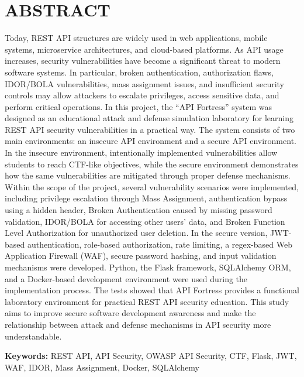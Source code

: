 \clearpage
\section*{ABSTRACT}
\label{ozeten}

Today, REST API structures are widely used in web applications, mobile systems, microservice architectures, and cloud-based platforms. As API usage increases, security vulnerabilities have become a significant threat to modern software systems. In particular, broken authentication, authorization flaws, IDOR/BOLA vulnerabilities, mass assignment issues, and insufficient security controls may allow attackers to escalate privileges, access sensitive data, and perform critical operations. In this project, the ``API Fortress'' system was designed as an educational attack and defense simulation laboratory for learning REST API security vulnerabilities in a practical way. The system consists of two main environments: an insecure API environment and a secure API environment. In the insecure environment, intentionally implemented vulnerabilities allow students to reach CTF-like objectives, while the secure environment demonstrates how the same vulnerabilities are mitigated through proper defense mechanisms. Within the scope of the project, several vulnerability scenarios were implemented, including privilege escalation through Mass Assignment, authentication bypass using a hidden header, Broken Authentication caused by missing password validation, IDOR/BOLA for accessing other users' data, and Broken Function Level Authorization for unauthorized user deletion. In the secure version, JWT-based authentication, role-based authorization, rate limiting, a regex-based Web Application Firewall (WAF), secure password hashing, and input validation mechanisms were developed. Python, the Flask framework, SQLAlchemy ORM, and a Docker-based development environment were used during the implementation process. The tests showed that API Fortress provides a functional laboratory environment for practical REST API security education. This study aims to improve secure software development awareness and make the relationship between attack and defense mechanisms in API security more understandable.

\vspace{3mm}

\noindent \textbf{Keywords:} REST API, API Security, OWASP API Security, CTF, Flask, JWT, WAF, IDOR, Mass Assignment, Docker, SQLAlchemy

\clearpage
